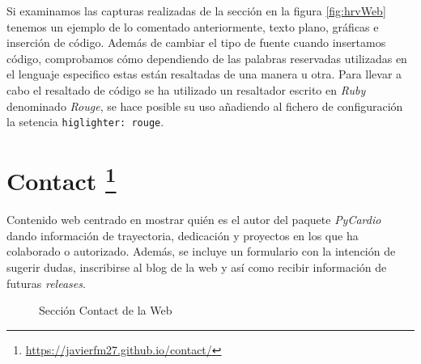 Si examinamos las capturas realizadas de la sección en la figura \ref{fig:hrvWeb} tenemos un ejemplo de lo comentado anteriormente, texto plano, gráficas e inserción de código. Además de cambiar el tipo de fuente cuando insertamos código, comprobamos cómo dependiendo de las palabras reservadas utilizadas en el lenguaje especifico estas están resaltadas de una manera u otra. Para llevar a cabo el resaltado de código se ha utilizado un resaltador escrito en  \textit{Ruby} denominado \textit{Rouge}, se hace posible su uso añadiendo al fichero de configuración la setencia \texttt{higlighter: rouge}.


\section[Contact]{Contact \footnote{\url{https://javierfm27.github.io/contact/}}}
\label{sec:contactWeb}
Contenido web centrado en mostrar quién es el autor del paquete \textit{PyCardio} dando información de trayectoria, dedicación y proyectos en los que ha colaborado o autorizado. Además, se incluye un formulario con la intención de sugerir dudas, inscribirse al blog de la web y así como recibir información de futuras \textit{releases}.

\begin{figure}[H]
    \centering
    \caption{Sección Contact de la Web}
    \label{fig:contactWeb}
\end{figure}


